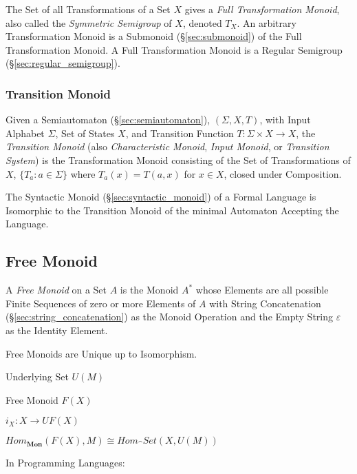 The Set of all Transformations of a Set $X$ gives a \emph{Full
  Transformation Monoid}, also called the \emph{Symmetric Semigroup}
of $X$, denoted $T_X$. An arbitrary Transformation Monoid is a
Submonoid (\S\ref{sec:submonoid}) of the Full Transformation Monoid. A
Full Transformation Monoid is a Regular Semigroup
(\S\ref{sec:regular_semigroup}).



\subsubsection{Transition Monoid}\label{sec:transition_monoid}

Given a Semiautomaton (\S\ref{sec:semiautomaton}), $(\Sigma, X, T)$,
with Input Alphabet $\Sigma$, Set of States $X$, and Transition
Function $T : \Sigma \times X \rightarrow X$, the \emph{Transition
  Monoid} (also \emph{Characteristic Monoid}, \emph{Input Monoid}, or
\emph{Transition System}) is the Transformation Monoid consisting of
the Set of Transformations of $X$, $\{T_a : a \in \Sigma\}$ where
$T_a(x) = T(a,x)$ for $x \in X$, closed under Composition.

The Syntactic Monoid (\S\ref{sec:syntactic_monoid}) of a Formal
Language is Isomorphic to the Transition Monoid of the minimal
Automaton Accepting the Language.



\subsection{Free Monoid}\label{sec:free_monoid}

A \emph{Free Monoid} on a Set $A$ is the Monoid $A^*$ whose Elements
are all possible Finite Sequences of zero or more Elements of $A$ with
String Concatenation (\S\ref{sec:string_concatenation}) as the Monoid
Operation and the Empty String $\varepsilon$ as the Identity Element.

Free Monoids are Unique up to Isomorphism.

Underlying Set $U(M)$

Free Monoid $F(X)$

$i_X : X \rightarrow U F (X)$

$Hom_\mathbf{Mon}(F(X), M) \cong Hom_\cat{Set}(X, U(M))$

In Programming Languages:

